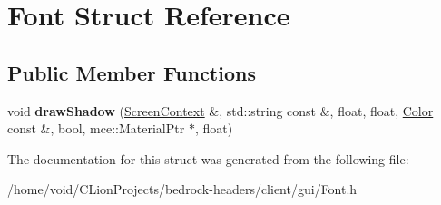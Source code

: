 \hypertarget{struct_font}{}\section{Font Struct Reference}
\label{struct_font}
\subsection*{Public Member Functions}
\begin{DoxyCompactItemize}
\item 
\mbox{\label{struct_font_a34ac873f4665b4aee9163bdd39d7eb75}} 
void {\bfseries draw\+Shadow} (\mbox{\hyperlink{struct_screen_context}{Screen\+Context}} \&, std\+::string const \&, float, float, \mbox{\hyperlink{struct_color}{Color}} const \&, bool, mce\+::\+Material\+Ptr $\ast$, float)
\end{DoxyCompactItemize}


The documentation for this struct was generated from the following file\+:\begin{DoxyCompactItemize}
\item 
/home/void/\+C\+Lion\+Projects/bedrock-\/headers/client/gui/Font.\+h\end{DoxyCompactItemize}
